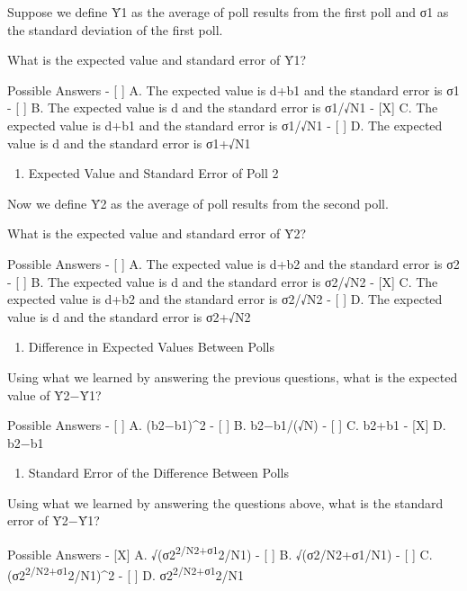\documentclass[
]{article}
\providecommand{\tightlist}{%
  \setlength{\itemsep}{0pt}\setlength{\parskip}{0pt}}
\begin{document}
Suppose we define Ȳ1 as the average of poll results from the first poll
and σ1 as the standard deviation of the first poll.

What is the expected value and standard error of Ȳ1?

Possible Answers - {[} {]} A. The expected value is d+b1 and the
standard error is σ1 - {[} {]} B. The expected value is d and the
standard error is σ1/√N1 - {[}X{]} C. The expected value is d+b1 and the
standard error is σ1/√N1 - {[} {]} D. The expected value is d and the
standard error is σ1+√N1

\begin{enumerate}
\def\labelenumi{\arabic{enumi}.}
\setcounter{enumi}{9}
\tightlist
\item
  Expected Value and Standard Error of Poll 2
\end{enumerate}

Now we define Ȳ2 as the average of poll results from the second poll.

What is the expected value and standard error of Ȳ2?

Possible Answers - {[} {]} A. The expected value is d+b2 and the
standard error is σ2 - {[} {]} B. The expected value is d and the
standard error is σ2/√N2 - {[}X{]} C. The expected value is d+b2 and the
standard error is σ2/√N2 - {[} {]} D. The expected value is d and the
standard error is σ2+√N2

\begin{enumerate}
\def\labelenumi{\arabic{enumi}.}
\setcounter{enumi}{10}
\tightlist
\item
  Difference in Expected Values Between Polls
\end{enumerate}

Using what we learned by answering the previous questions, what is the
expected value of Ȳ2−Ȳ1?

Possible Answers - {[} {]} A. (b2−b1)\^{}2 - {[} {]} B. b2−b1/(√N) - {[}
{]} C. b2+b1 - {[}X{]} D. b2−b1

\begin{enumerate}
\def\labelenumi{\arabic{enumi}.}
\setcounter{enumi}{11}
\tightlist
\item
  Standard Error of the Difference Between Polls
\end{enumerate}

Using what we learned by answering the questions above, what is the
standard error of Ȳ2−Ȳ1?

Possible Answers - {[}X{]} A. √(σ2\textsuperscript{2/N2+σ1}2/N1) - {[}
{]} B. √(σ2/N2+σ1/N1) - {[} {]} C.
(σ2\textsuperscript{2/N2+σ1}2/N1)\^{}2 - {[} {]} D.
σ2\textsuperscript{2/N2+σ1}2/N1
\end{document}
